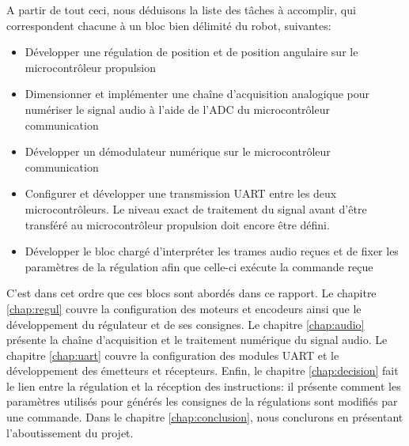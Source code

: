 A partir de tout ceci, nous déduisons la liste des tâches à accomplir, qui correspondent chacune à un bloc bien délimité du robot, suivantes:
\begin{itemize}
  \item Développer une régulation de position et de position angulaire sur le microcontrôleur propulsion
  \item Dimensionner et implémenter une chaîne d'acquisition analogique pour numériser le signal audio à l'aide de l'ADC du microcontrôleur communication
  \item Développer un démodulateur numérique sur le microcontrôleur communication
  \item Configurer et développer une transmission UART entre les deux microcontrôleurs. Le niveau exact de traitement du signal avant d'être transféré au microcontrôleur propulsion doit encore être défini.
  \item Développer le bloc chargé d'interpréter les trames audio reçues et de fixer les paramètres de la régulation afin que celle-ci exécute la commande reçue
\end{itemize}

C'est dans cet ordre que ces blocs sont abordés dans ce rapport. Le chapitre \ref{chap:regul} couvre la configuration des moteurs et encodeurs ainsi que le développement du régulateur et de ses consignes. Le chapitre \ref{chap:audio} présente la chaîne d'acquisition et le traitement numérique du signal audio. Le chapitre \ref{chap:uart} couvre la configuration des modules UART et le développement des émetteurs et récepteurs. Enfin, le chapitre \ref{chap:decision} fait le lien entre la régulation et la réception des instructions: il présente comment les paramètres utilisés pour générés les consignes de la régulations sont modifiés par une commande. Dans le chapitre \ref{chap:conclusion}, nous conclurons en présentant l'aboutissement du projet.
